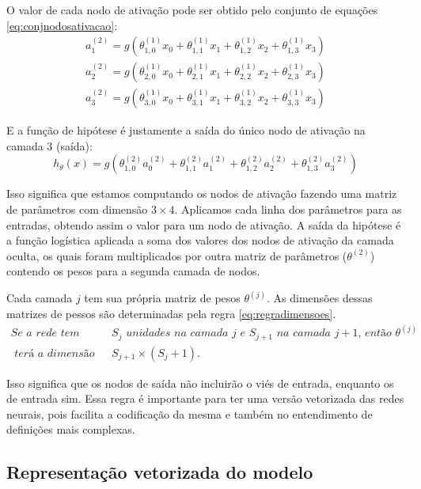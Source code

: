 O valor de cada nodo de ativação pode ser obtido pelo conjunto de equações \ref{eq:conjnodosativacao}:
\begin{align}
a_1^{(2)} = g(\theta_{1,0}^{(1)}x_0 + \theta_{1,1}^{(1)}x_1 + \theta_{1,2}^{(1)}x_2 + \theta_{1,3}^{(1)}x_3) \nonumber \\
a_2^{(2)} = g(\theta_{2,0}^{(1)}x_0 + \theta_{2,1}^{(1)}x_1 + \theta_{2,2}^{(1)}x_2 + \theta_{2,3}^{(1)}x_3) \nonumber \\
a_3^{(2)} = g(\theta_{3,0}^{(1)}x_0 + \theta_{3,1}^{(1)}x_1 + \theta_{3,2}^{(1)}x_2 + \theta_{3,3}^{(1)}x_3) \label{eq:conjnodosativacao}
\end{align}

E a função de hipótese é justamente a saída do único nodo de ativação na camada 3 (saída):
\begin{equation}
h_{\theta}(x) = g(\theta_{1,0}^{(2)}a_0^{(2)} + \theta_{1,1}^{(2)}a_1^{(2)} + \theta_{1,2}^{(2)}a_2^{(2)} + \theta_{1,3}^{(2)}a_3^{(2)}) \nonumber
\end{equation}

Isso significa que estamos computando os nodos de ativação fazendo uma matriz de parâmetros com dimensão $3 \times 4$. Aplicamos cada linha dos parâmetros para as entradas, obtendo assim o valor para um nodo de ativação. A saída da hipótese é a função logística aplicada a soma dos valores dos nodos de ativação da camada oculta, os quais foram multiplicados por outra matriz de parâmetros ($\theta^{(2)}$) contendo os pesos para a segunda camada de nodos.

Cada camada $j$ tem sua própria matriz de pesos $\theta^{(j)}$. As dimensões dessas matrizes de pessos são determinadas pela regra \ref{eq:regradimensoes}. 
\begin{align} 
\textit{Se a rede tem } & S_j \textit{ unidades na camada } j \textit{ e } S_{j+1} \textit{ na camada } j+1\textit{, então } \theta^{(j)} \nonumber \\ 
\textit{ terá a dimensão de } & S_{j+1} \times (S_j + 1)\textit{.} \label{eq:regradimensoes}
\end{align}

Isso significa que os nodos de saída não incluirão o viés de entrada, enquanto os de entrada sim. Essa regra é importante para ter uma versão vetorizada das redes neurais, pois facilita a codificação da mesma e também no entendimento de definições mais complexas.


\subsection{Representação vetorizada do modelo}

